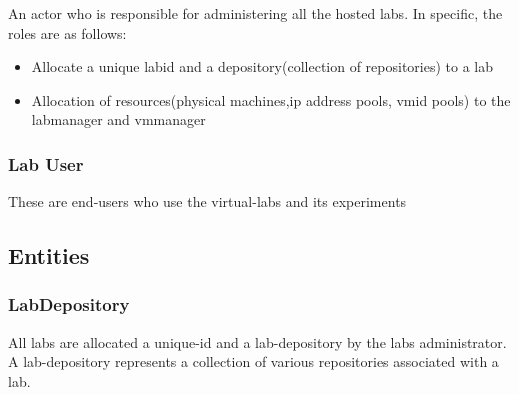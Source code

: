 \documentclass[11pt]{article}
\begin{document}
   An actor who is responsible for administering all the hosted
   labs. In specific, the roles are as follows:
\begin{itemize}
\item Allocate a unique labid and a depository(collection of
       repositories) to a lab
\item Allocation of resources(physical machines,ip address pools,
       vmid pools) to the labmanager and vmmanager
\end{itemize}
\subsubsection{Lab User}
\label{sec-1.2.3}

   These are end-users who use the virtual-labs and its experiments
\subsection{Entities}
\label{sec-1.3}

\subsubsection{LabDepository}
\label{sec-1.3.1}


     All labs are allocated a unique-id and a lab-depository by the
     labs administrator. A lab-depository represents a collection of
     various repositories associated with a lab.
\end{document}
